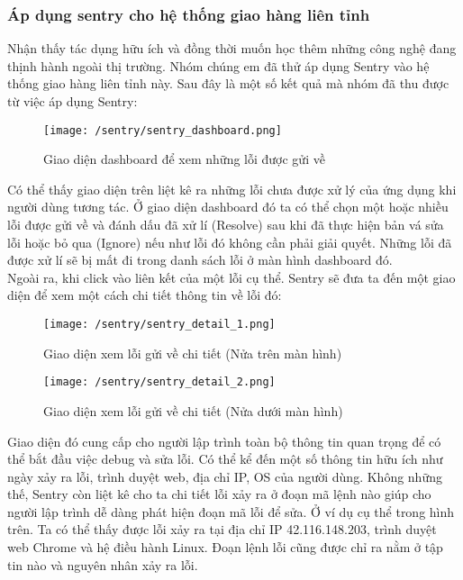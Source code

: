 				
			
			\subsubsection{Áp dụng sentry cho hệ thống giao hàng liên tỉnh}
			 	Nhận thấy tác dụng hữu ích và đồng thời muốn học thêm những công nghệ đang thịnh hành ngoài thị trường. Nhóm chúng em đã thử áp dụng Sentry vào hệ thống giao hàng liên tỉnh này. Sau đây là một số kết quả mà nhóm đã thu được từ việc áp dụng Sentry:
			 	
			 	\begin{figure}[H]
			 		\texttt{[image: /sentry/sentry\_dashboard.png]}
			 		\centering
			 		\caption{Giao diện dashboard để xem những lỗi được gửi về}
			 	\end{figure}
		 	
		 		Có thể thấy giao diện trên liệt kê ra những lỗi chưa được xử lý của ứng dụng khi người dùng tương tác. Ở giao diện dashboard đó ta có thể chọn một hoặc nhiều lỗi được gửi về và đánh dấu đã xử lí (Resolve) sau khi đã thực hiện bản vá sửa lỗi hoặc bỏ qua (Ignore) nếu như lỗi đó không cần phải giải quyết. Những lỗi đã được xử lí sẽ bị mất đi trong danh sách lỗi ở màn hình dashboard đó. \\
		 		
		 		Ngoài ra, khi click vào liên kết của một lỗi cụ thể. Sentry sẽ đưa ta đến một giao diện để xem một cách chi tiết thông tin về lỗi đó:
		 		
			 	\begin{figure}[H]
			 		\texttt{[image: /sentry/sentry\_detail\_1.png]}
			 		\centering
			 		\caption{Giao diện xem lỗi gửi về chi tiết (Nửa trên màn hình)}
			 	\end{figure}
		 	
		 		\begin{figure}[H]
		 			\texttt{[image: /sentry/sentry\_detail\_2.png]}
		 			\centering
		 			\caption{Giao diện xem lỗi gửi về chi tiết (Nửa dưới màn hình)}
		 		\end{figure}
			 	
			 	Giao diện đó cung cấp cho người lập trình toàn bộ thông tin quan trọng để có thể bắt đầu việc debug và sửa lỗi. Có thể kể đến một số thông tin hữu ích như ngày xảy ra lỗi, trình duyệt web, địa chỉ IP, OS của người dùng. Không những thế, Sentry còn liệt kê cho ta chi tiết lỗi xảy ra ở đoạn mã lệnh nào giúp cho người lập trình dễ dàng phát hiện đoạn mã lỗi để sửa. Ở ví dụ cụ thể trong hình trên. Ta có thể thấy được lỗi xảy ra tại địa chỉ IP 42.116.148.203, trình duyệt web Chrome và hệ điều hành Linux. Đoạn lệnh lỗi cũng được chỉ ra nằm ở tập tin nào và nguyên nhân xảy ra lỗi. \\
			 	
